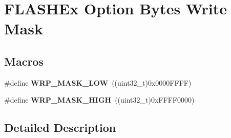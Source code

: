 \hypertarget{group___f_l_a_s_h_ex___option___bytes___write___mask}{\section{F\-L\-A\-S\-H\-Ex Option Bytes Write Mask}
\label{group___f_l_a_s_h_ex___option___bytes___write___mask}
}
\subsection*{Macros}
\begin{DoxyCompactItemize}
\item 
\hypertarget{group___f_l_a_s_h_ex___option___bytes___write___mask_ga47c0a8239451373910f64418c4a0bb41}{\#define {\bfseries W\-R\-P\-\_\-\-M\-A\-S\-K\-\_\-\-L\-O\-W}~((uint32\-\_\-t)0x0000\-F\-F\-F\-F)}\label{group___f_l_a_s_h_ex___option___bytes___write___mask_ga47c0a8239451373910f64418c4a0bb41}

\item 
\hypertarget{group___f_l_a_s_h_ex___option___bytes___write___mask_ga022b295d484d0463af6dd99db963073d}{\#define {\bfseries W\-R\-P\-\_\-\-M\-A\-S\-K\-\_\-\-H\-I\-G\-H}~((uint32\-\_\-t)0x\-F\-F\-F\-F0000)}\label{group___f_l_a_s_h_ex___option___bytes___write___mask_ga022b295d484d0463af6dd99db963073d}

\end{DoxyCompactItemize}


\subsection{Detailed Description}
